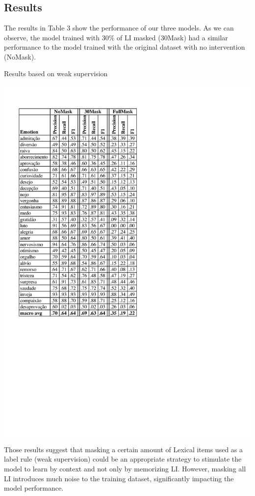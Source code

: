 \documentclass[12pt]{article}
\begin{document}
\subsection{Results}


The results in Table 3 show the performance of our three models. As we can observe, the model trained with 30\% of LI masked (30Mask) had a similar performance to the model trained with the original dataset with no intervention (NoMask).

\begin{table}[ht]
  \label{fig:results}
  \caption{Results based on weak supervision}
  \centering
  \includegraphics[trim=0.2cm 9.8cm 9.6cm 1.5cm, clip, scale=0.7]{img-n-tables/resultados.pdf}
\end{table}


Those results suggest that masking a certain amount of Lexical items used as a label rule (weak supervision) could be an appropriate strategy to stimulate the model to learn by context and not only by memorizing LI. However, masking all LI introduces much noise to the training dataset, significantly impacting the model performance.
\end{document}
